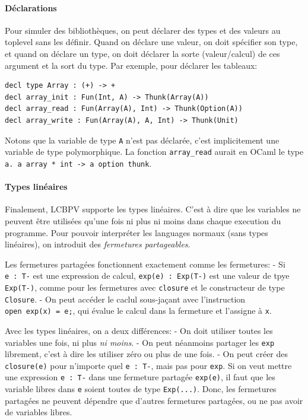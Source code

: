 \documentclass[12pt]{article}
\begin{document}
\hypertarget{duxe9clarations}{%
      \paragraph*{Déclarations}\label{duxe9clarations}}

Pour simuler des bibliothèques, on peut déclarer des types et des
valeurs au toplevel sans les définir. Quand on déclare une valeur, on
doit spécifier son type, et quand on déclare un type, on doit déclarer
la sorte (valeur/calcul) de ces argument et la sort du type. Par
exemple, pour déclarer les tableaux:

\begin{verbatim}
decl type Array : (+) -> +
decl array_init : Fun(Int, A) -> Thunk(Array(A))
decl array_read : Fun(Array(A), Int) -> Thunk(Option(A))
decl array_write : Fun(Array(A), A, Int) -> Thunk(Unit)
\end{verbatim}

Notons que la variable de type \texttt{A} n'est pas déclarée, c'est
implicitement une variable de type polymorphique. La fonction
\texttt{array\_read} aurait en OCaml le type
\texttt{\textquotesingle{}a.\ \textquotesingle{}a\ array\ *\ int\ -\textgreater{}\ \textquotesingle{}a\ option\ thunk}.

\hypertarget{types-linuxe9aires}{%
      \paragraph*{Types linéaires}\label{types-linuxe9aires}}

Finalement, LCBPV supporte les types linéaires. C'est à dire que les
variables ne peuvent être utilisées qu'une fois ni plus ni moins dans
chaque execution du programme. Pour pouvoir interpréter les languages
normaux (sans types linéaires), on introduit des \emph{fermetures
      partageables}.

Les fermetures partagées fonctionnent exactement comme les fermetures: -
Si \texttt{e\ :\ T-} est une expression de calcul,
\texttt{exp(e)\ :\ Exp(T-)} est une valeur de tpye \texttt{Exp(T-)},
comme pour les fermetures avec \texttt{closure} et le constructeur de
type \texttt{Closure}. - On peut accéder le caclul sous-jaçant avec
l'instruction \texttt{open\ exp(x)\ =\ e;}, qui évalue le calcul dans la
fermeture et l'assigne à \texttt{x}.

Avec les types linéaires, on a deux différences: - On doit utiliser
toutes les variables une fois, ni plus \emph{ni moins}. - On peut
néanmoins partager les \texttt{exp} librement, c'est à dire les utiliser
zéro ou plus de une fois. - On peut créer des \texttt{closure(e)} pour
n'importe quel \texttt{e\ :\ T-}, mais pas pour \texttt{exp}. Si on veut
mettre une expression \texttt{e\ :\ T-} dans une fermeture partagée
\texttt{exp(e)}, il faut que les variable libres dans \texttt{e} soient
toutes de type \texttt{Exp(...)}. Donc, les fermetures partagées ne
peuvent dépendre que d'autres fermetures partagées, ou ne pas avoir de
variables libres.
\end{document}
